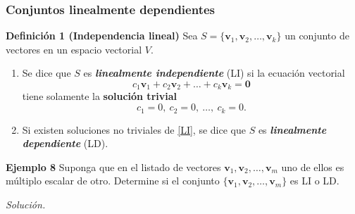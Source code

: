 {\nologo
\begin{frame}\frametitle{Conjuntos linealmente dependientes}
	
	\vspace{-2mm}
	\begin{block}{\textbf{Definición 1 (Independencia lineal)}}
		\justifying
		Sea $S=\{\mathbf{v}_1,\mathbf{v}_2,\hdots,\mathbf{v}_k\}$ un conjunto de vectores
		en un espacio vectorial $V$.
		
		\begin{enumerate}[$a$]%
			\item Se dice que $S$ es \textbf{\textit{linealmente independiente}} (LI) si
			la ecuación vectorial
			\begin{equation}\tag{1}
			c_1\mathbf{v}_1+c_2\mathbf{v}_2+\hdots+c_k\mathbf{v}_k = \mathbf{0}
			\end{equation}
			tiene solamente la \textbf{solución trivial}
			\[
			c_1 =0,\ c_2 =0,\ \hdots,\ c_k=0.
			\]
			
			\item Si existen soluciones no triviales de \eqref{LI}, se dice que $S$ es \textbf{\textit{linealmente dependiente}} (LD).
		\end{enumerate}		
	\end{block}
	
	\begin{ej}{\textbf{Ejemplo 8}} \justifying
		Suponga que en el listado de vectores $\mathbf{v}_1,\mathbf{v}_2,\hdots,\mathbf{v}_m$ uno de ellos
		es múltiplo escalar de otro. Determine si el conjunto 
		$\{\mathbf{v}_1,\mathbf{v}_2,\hdots,\mathbf{v}_m\}$ es LI o LD.		
	\end{ej}	
	\textit{Solución.}
	
\end{frame}
}
